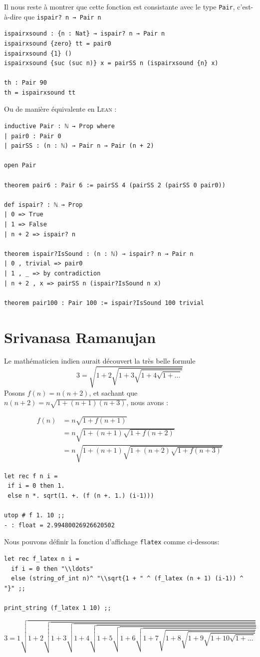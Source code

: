Il nous reste à montrer que cette fonction est consistante avec le type \texttt{Pair}, c'est-à-dire que 
\texttt{ispair? n →  Pair n}

\begin{verbatim}
ispairxsound : {n : Nat} → ispair? n → Pair n
ispairxsound {zero} tt = pair0
ispairxsound {1} () 
ispairxsound {suc (suc n)} x = pairSS n (ispairxsound {n} x)

th : Pair 90
th = ispairxsound tt
\end{verbatim}

Ou de manière équivalente en \textsc{Lean} :
\begin{verbatim}
inductive Pair : ℕ → Prop where
| pair0 : Pair 0
| pairSS : (n : ℕ) → Pair n → Pair (n + 2)

open Pair

theorem pair6 : Pair 6 := pairSS 4 (pairSS 2 (pairSS 0 pair0))

def ispair? : ℕ → Prop
| 0 => True
| 1 => False
| n + 2 => ispair? n

theorem ispair?IsSound : (n : ℕ) → ispair? n → Pair n
| 0 , trivial => pair0
| 1 , _ => by contradiction
| n + 2 , x => pairSS n (ispair?IsSound n x)

theorem pair100 : Pair 100 := ispair?IsSound 100 trivial 
\end{verbatim}

\section{Srivanasa Ramanujan}
Le mathématicien indien aurait  découvert la très belle formule 
$$ 3 = \sqrt{1+2\sqrt{1+3\sqrt{1+4\sqrt{1+\ldots}}}} $$
Posons $f(n) = n(n+2)$, et sachant que $n(n+2) = n \sqrt{1+(n+1)(n+3)}$, nous avons :

\begin{align*}
	f(n) &= n\sqrt{1+f(n+1)} \\
	 	 &= n\sqrt{1+(n+1)\sqrt{1+f(n+2)}} \\
	 	 &= n\sqrt{1+(n+1)\sqrt{1+(n+2)\sqrt{1+f(n+3)}}}
\end{align*}

\begin{verbatim}
let rec f n i =
 if i = 0 then 1.
 else n *. sqrt(1. +. (f (n +. 1.) (i-1)))

utop # f 1. 10 ;;
- : float = 2.99480026926620502
\end{verbatim}

Nous pouvons définir la fonction d'affichage \texttt{flatex} comme ci-dessous:
\begin{verbatim}
let rec f_latex n i =
  if i = 0 then "\\ldots"  
  else (string_of_int n)^ "\\sqrt{1 + " ^ (f_latex (n + 1) (i-1)) ^ "}" ;;

print_string (f_latex 1 10) ;;	
\end{verbatim}
$$3 = 1\sqrt{1 + 2\sqrt{1 + 3\sqrt{1 + 4\sqrt{1 + 5\sqrt{1 + 6\sqrt{1 + 7\sqrt{1 + 8\sqrt{1 + 9\sqrt{1 + 10\sqrt{1 + \ldots}}}}}}}}}}
$$


